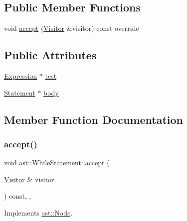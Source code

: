 \subsection*{Public Member Functions}
\begin{DoxyCompactItemize}
\item 
void \hyperlink{structast_1_1_while_statement_affd0d8e9b8f52eea2153f7721e792c12}{accept} (\hyperlink{structast_1_1_visitor}{Visitor} \&visitor) const override
\end{DoxyCompactItemize}
\subsection*{Public Attributes}
\begin{DoxyCompactItemize}
\item 
\hyperlink{structast_1_1_expression}{Expression} $\ast$ \hyperlink{structast_1_1_while_statement_a62b08ab6d74dc0d29d66beb2e1b3dbc4}{test}
\item 
\hyperlink{structast_1_1_statement}{Statement} $\ast$ \hyperlink{structast_1_1_while_statement_a2bbde085867f2ab699a5795edee77ff3}{body}
\end{DoxyCompactItemize}


\subsection{Member Function Documentation}
\mbox{\label{structast_1_1_while_statement_affd0d8e9b8f52eea2153f7721e792c12}} 
\subsubsection{\texorpdfstring{accept()}{accept()}}
{\footnotesize\ttfamily void ast\+::\+While\+Statement\+::accept (\begin{DoxyParamCaption}\item[{\hyperlink{structast_1_1_visitor}{Visitor} \&}]{visitor }\end{DoxyParamCaption}) const\hspace{0.3cm}{\ttfamily [inline]}, {\ttfamily [override]}, {\ttfamily [virtual]}}



Implements \hyperlink{structast_1_1_node_abc089ee6caaf06a4445ebdd8391fdebc}{ast\+::\+Node}.




